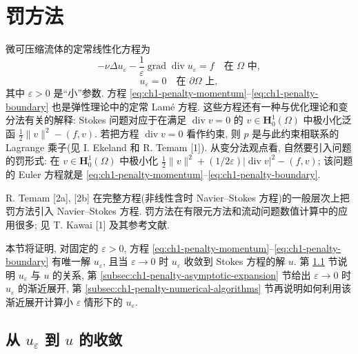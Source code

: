 \clearpage
\section{罚方法}
\label{sec:ch1-penalty-method}

微可压缩流体的定常线性化方程为
\begin{equation}
-\nu\Delta u_\varepsilon
-\frac{1}{\varepsilon}\operatorname{grad}\operatorname{div}u_\varepsilon=f
\quad\text{在 }\Omega\text{ 中},
\label{eq:ch1-penalty-momentum}
\end{equation}
\begin{equation}
u_\varepsilon=0\quad\text{在 }\partial\Omega\text{ 上},
\label{eq:ch1-penalty-boundary}
\end{equation}
其中 $\varepsilon>0$ 是``小''参数. 方程 \eqref{eq:ch1-penalty-momentum}--\eqref{eq:ch1-penalty-boundary} 也是弹性理论中的定常 Lamé 方程. 这些方程还有一种与优化理论和变分法有关的解释: Stokes 问题对应于在满足 $\operatorname{div}v=0$ 的 $v\in\mathbf H_0^1(\Omega)$ 中极小化泛函 $\tfrac12\lVert v\rVert^2-(f,v)$. 若把方程 $\operatorname{div}v=0$ 看作约束, 则 $p$ 是与此约束相联系的 Lagrange 乘子(见 I. Ekeland 和 R. Temam [1]). 从变分法观点看, 自然要引入问题的罚形式: 在 $v\in\mathbf H_0^1(\Omega)$ 中极小化 $\tfrac12\lVert v\rVert^2+(1/2\varepsilon)\lvert\operatorname{div}v\rvert^2-(f,v)$; 该问题的 Euler 方程就是 \eqref{eq:ch1-penalty-momentum}--\eqref{eq:ch1-penalty-boundary}.

R. Temam [2a], [2b] 在完整方程(非线性含时 Navier--Stokes 方程)的一般层次上把罚方法引入 Navier--Stokes 方程. 罚方法在有限元方法和流动问题数值计算中的应用很多; 见 T. Kawai [1] 及其参考文献.

本节将证明, 对固定的 $\varepsilon>0$, 方程 \eqref{eq:ch1-penalty-momentum}--\eqref{eq:ch1-penalty-boundary} 有唯一解 $u_\varepsilon$, 且当 $\varepsilon\to0$ 时 $u_\varepsilon$ 收敛到 Stokes 方程的解 $u$. 第 \ref{subsec:ch1-penalty-convergence} 节说明 $u_\varepsilon$ 与 $u$ 的关系, 第 \ref{subsec:ch1-penalty-asymptotic-expansion} 节给出 $\varepsilon\to0$ 时 $u_\varepsilon$ 的渐近展开, 第 \ref{subsec:ch1-penalty-numerical-algorithms} 节再说明如何利用该渐近展开计算小 $\varepsilon$ 情形下的 $u_\varepsilon$.

\subsection{从 \texorpdfstring{$u_\varepsilon$}{u epsilon} 到 \texorpdfstring{$u$}{u} 的收敛}
\label{subsec:ch1-penalty-convergence}

